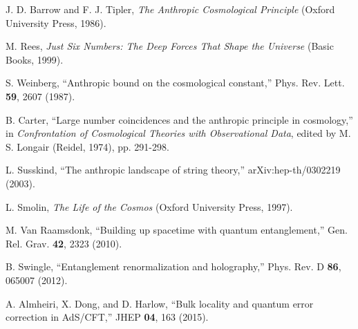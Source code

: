 \documentclass[12pt,a4paper]{article}
\begin{document}
\begin{thebibliography}{99}

J. D. Barrow and F. J. Tipler, \emph{The Anthropic Cosmological Principle} (Oxford University Press, 1986).

M. Rees, \emph{Just Six Numbers: The Deep Forces That Shape the Universe} (Basic Books, 1999).

S. Weinberg, ``Anthropic bound on the cosmological constant,'' Phys. Rev. Lett. \textbf{59}, 2607 (1987).

B. Carter, ``Large number coincidences and the anthropic principle in cosmology,'' in \emph{Confrontation of Cosmological Theories with Observational Data}, edited by M. S. Longair (Reidel, 1974), pp. 291-298.

L. Susskind, ``The anthropic landscape of string theory,'' arXiv:hep-th/0302219 (2003).

L. Smolin, \emph{The Life of the Cosmos} (Oxford University Press, 1997).

M. Van Raamsdonk, ``Building up spacetime with quantum entanglement,'' Gen. Rel. Grav. \textbf{42}, 2323 (2010).

B. Swingle, ``Entanglement renormalization and holography,'' Phys. Rev. D \textbf{86}, 065007 (2012).

A. Almheiri, X. Dong, and D. Harlow, ``Bulk locality and quantum error correction in AdS/CFT,'' JHEP \textbf{04}, 163 (2015).

\end{thebibliography}
\end{document}

